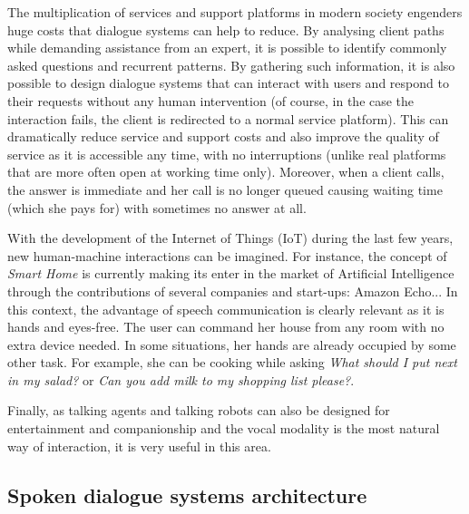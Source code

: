 					The multiplication of services and support platforms in modern society engenders huge costs that dialogue systems can help to reduce. By analysing client paths while demanding assistance from an expert, it is possible to identify commonly asked questions and recurrent patterns. By gathering such information, it is also possible to design dialogue systems that can interact with users and respond to their requests without any human intervention (of course, in the case the interaction fails, the client is redirected to a normal service platform). This can dramatically reduce service and support costs and also improve the quality of service as it is accessible any time, with no interruptions (unlike real platforms that are more often open at working time only). Moreover, when a client calls, the answer is immediate and her call is no longer queued causing waiting time (which she pays for) with sometimes no answer at all.

		With the development of the Internet of Things (IoT) during the last few years, new human-machine interactions can be imagined. For instance, the concept of \textit{Smart Home} is currently making its enter in the market of Artificial Intelligence through the contributions of several companies and start-ups: Amazon Echo... In this context, the advantage of speech communication is clearly relevant as it is hands and eyes-free. The user can command her house from any room with no extra device needed. In some situations, her hands are already occupied by some other task. For example, she can be cooking \cite{Laroche2013} while asking \textit{What should I put next in my salad?} or \textit{Can you add milk to my shopping list please?}.

					Finally, as talking agents and talking robots can also be designed for entertainment and companionship \cite{Sidner2013} and the vocal modality is the most natural way of interaction, it is very useful in this area.
					
	\subsection{Spoken dialogue systems architecture}
	\label{soa:architecture}


